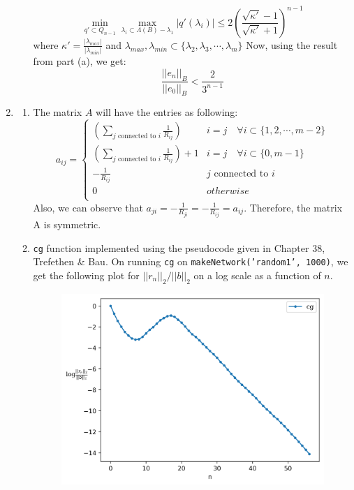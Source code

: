 \documentclass{article}
\begin{document}
\begin{enumerate}
\begin{enumerate}[label=(\alph*)]
    $$\min_{q' \subset Q_{n - 1}}\max_{\lambda_i \subset \Lambda(B) - \lambda_1}|q'(\lambda_i)| \leq 2 (\frac{\sqrt{\kappa'} - 1}{\sqrt{\kappa'} + 1})^{n - 1}$$
    where $\kappa' = \frac{|\lambda_{max}|}{|\lambda_{min}|}$ and $\lambda_{max}, \lambda_{min} \subset \{\lambda_2, \lambda_3, \cdots, \lambda_m\}$
    Now, using the result from part (a), we get:
    $$\frac{||e_n||_B}{||e_0||_B} < \frac{2}{3^{n - 1}}$$
    \end{enumerate}
    \clearpage
    \item 
    \begin{enumerate}[label=(\alph*)]
        \item  The matrix $A$ will have the entries as following:
        $$a_{ij} = \begin{cases}
            (\sum\limits_{j \textrm{ connected to } i} \frac{1}{R_{ij}}) & i = j \quad \forall i \subset \{1, 2, \cdots, m - 2\}\\
            (\sum\limits_{j \textrm{ connected to } i} \frac{1}{R_{ij}}) + 1 & i = j \quad \forall i \subset \{0, m - 1\}\\
            -\frac{1}{R_{ij}} & j \textrm{ connected to } i\\
            0 & otherwise\\
        \end{cases}$$
        Also, we can observe that $a_{ji} = -\frac{1}{R_{ji}} = -\frac{1}{R_{ij}} = a_{ij}$. Therefore, the matrix A is symmetric.
        \item \texttt{cg} function implemented using the pseudocode given in Chapter 38, Trefethen \& Bau. On running \texttt{cg} on \texttt{makeNetwork('random1', 1000)}, we get the following plot for $||r_n||_2 / ||b||_2$ on a log scale as a function of $n$.
        \begin{figure}[!ht]
            \centering
            \includegraphics[scale=0.65]{fig1.png}

\end{figure}
\end{enumerate}
\end{enumerate}
\end{document}
